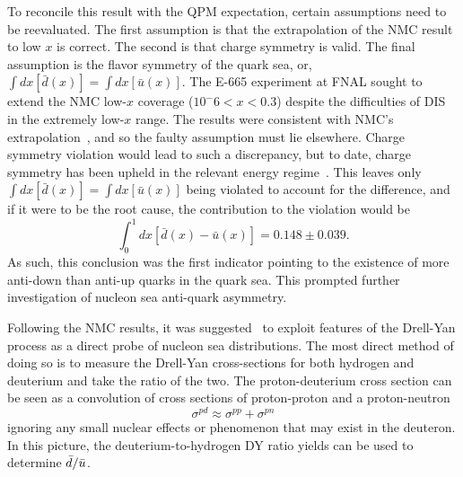 To reconcile this result with the QPM expectation, certain assumptions need to be reevaluated. The first assumption is that the extrapolation of the NMC result to low $x$ is correct. The second is that charge symmetry is valid. The final assumption is the flavor symmetry of the quark sea, or, $\int dx [\bar{d}(x)] = \int dx [\bar{u}(x)]$. The E-665 experiment at FNAL sought to extend the NMC low-$x$ coverage ($10^-6 < x < 0.3$) despite the difficulties of DIS in the extremely low-$x$ range. The results were consistent with NMC's extrapolation~\cite{Adams:1995sh}, and so the faulty assumption must lie elsewhere. Charge symmetry violation would lead to such a discrepancy, but to date, charge symmetry has been upheld in the relevant energy regime~\cite{Abegg:1998sg}. This leaves only $\int dx [\bar{d}(x)] = \int dx [\bar{u}(x)]$ being violated to account for the difference, and if it were to be the root cause, the contribution to the violation would be
\begin{equation}
\int_0^1 dx[\bar{d}(x) - \bar{u}(x)] = 0.148 \pm 0.039.
\end{equation}
As such, this conclusion was the first indicator pointing to the existence of more anti-down than anti-up quarks in the quark sea. This prompted further investigation of nucleon sea anti-quark asymmetry.

Following the NMC results, it was suggested~\cite{Ellis:1990ti} to exploit features of the Drell-Yan process as a direct probe of nucleon sea distributions. The most direct method of doing so is to measure the Drell-Yan cross-sections for both hydrogen and deuterium and take the ratio of the two. The proton-deuterium cross section can be seen as a convolution of cross sections of proton-proton and a proton-neutron
\begin{equation}
\sigma^{pd} \approx \sigma^{pp} + \sigma^{pn}
\end{equation}
ignoring any small nuclear effects or phenomenon that may exist in the deuteron. In this picture, the deuterium-to-hydrogen DY ratio yields can be used to determine $\bar{d}/\bar{u}$.

